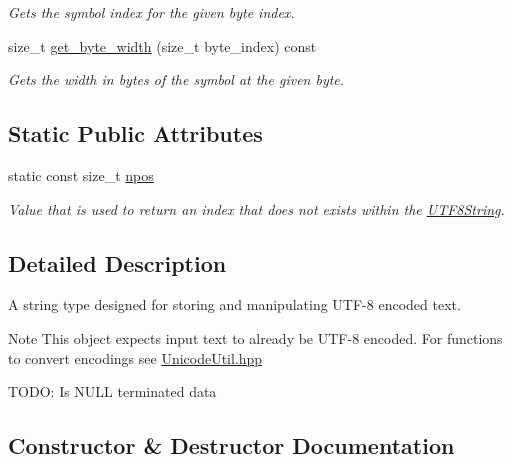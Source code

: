 \begin{DoxyCompactItemize}
\begin{DoxyCompactList}\small\item\em Gets the symbol index for the given byte index. \end{DoxyCompactList}\item 
size\+\_\+t \hyperlink{classchaos_1_1str_1_1_u_t_f8_string_a387abdce2189a379961844cd0a42a97a}{get\+\_\+byte\+\_\+width} (size\+\_\+t byte\+\_\+index) const 
\begin{DoxyCompactList}\small\item\em Gets the width in bytes of the symbol at the given byte. \end{DoxyCompactList}\end{DoxyCompactItemize}
\subsection*{Static Public Attributes}
\begin{DoxyCompactItemize}
\item 
\hypertarget{classchaos_1_1str_1_1_u_t_f8_string_a7e301ebfad4cd1b14e3a13cb0595b43b}{}static const size\+\_\+t \hyperlink{classchaos_1_1str_1_1_u_t_f8_string_a7e301ebfad4cd1b14e3a13cb0595b43b}{npos}\label{classchaos_1_1str_1_1_u_t_f8_string_a7e301ebfad4cd1b14e3a13cb0595b43b}

\begin{DoxyCompactList}\small\item\em Value that is used to return an index that does not exists within the \hyperlink{classchaos_1_1str_1_1_u_t_f8_string}{U\+T\+F8\+String}. \end{DoxyCompactList}\end{DoxyCompactItemize}


\subsection{Detailed Description}
A string type designed for storing and manipulating U\+T\+F-\/8 encoded text. 

\begin{DoxyNote}{Note}
This object expects input text to already be U\+T\+F-\/8 encoded. For functions to convert encodings see \hyperlink{_unicode_util_8hpp}{Unicode\+Util.\+hpp}
\end{DoxyNote}
T\+O\+D\+O\+: Is N\+U\+L\+L terminated data 

\subsection{Constructor \& Destructor Documentation}
\hypertarget{classchaos_1_1str_1_1_u_t_f8_string_a173513bf2d62d742bee337b00716bf82}{}
